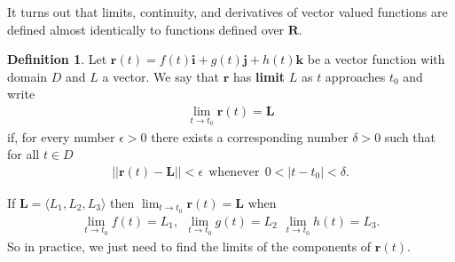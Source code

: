 \documentclass[12pt, letter]{article}
\theoremstyle{plain}
\numberwithin{theorem}{section}
\theoremstyle{definition}
\newtheorem{definition}[theorem]{Definition}
\begin{document}
\bigskip

\hrulefill

\bigskip

It turns out that limits, continuity, and derivatives of vector valued functions are defined almost identically to functions defined over $\bm{R}$.

\bigskip

\begin{definition}
Let $\bm{r}(t) = f(t) \bm{i} + g(t) \bm{j} + h(t) \bm{k}$ be a vector function with domain $D$ and $L$ a vector. We say that $\bm{r}$ has \textbf{limit} $L$ as $t$ approaches $t_0$ and write
\begin{align*}
\lim_{t\to t_0} \bm{r}(t) = \bm{L}
\end{align*}
if, for every number $\epsilon >0$ there exists a corresponding number $\delta >0$ such that for all $t\in D$
\begin{align*}
||\bm{r}(t) - \bm{L}|| < \epsilon \ \ \text{whenever} \ \ 0<|t-t_0|<\delta.
\end{align*}
\end{definition}

\bigskip

If $\bm{L} = \langle L_1, L_2, L_3 \rangle$ then $\lim_{t\to t_0} \bm{r}(t) = \bm{L}$ when
\begin{align*}
\lim_{t\to t_0} f(t) = L_1, \ \ \lim_{t\to t_0} g(t) = L_2 \ \ \lim_{t\to t_0} h(t) = L_3.
\end{align*}
So in practice, we just need to find the limits of the components of $\bm{r}(t)$.

\bigskip

\hrulefill

\bigskip
\end{document}
